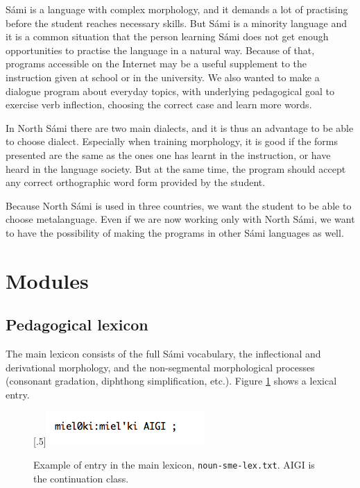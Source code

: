 \documentclass[a4paper,12pt]{article}
\begin{document}
Sámi is a language with complex morphology, and it demands a lot of practising before the student reaches necessary skills. But Sámi is a minority language and it is a common situation that the person learning Sámi does not get enough opportunities to practise the language in a natural way. Because of that, programs accessible on the Internet may be a useful supplement to the instruction given at school or in the university. We also wanted to make a dialogue program about everyday topics, with underlying pedagogical goal to exercise verb inflection, choosing the correct case and learn more words. 

In North Sámi there are two main dialects, and it is thus an advantage to be able to choose dialect. Especially when training morphology, it is good if the forms presented are the same as the ones one has learnt in the instruction, or have heard in the language society. But at the same time, the program should accept any correct orthographic word form provided by the student.

Because North Sámi is used in three countries, we want the student to be able to choose metalanguage. Even if we are now working only with North Sámi, we want to have the possibility of making the programs in other Sámi languages as well.



\section{Modules}

\subsection{Pedagogical lexicon}

The main lexicon consists of the full Sámi vocabulary, the inflectional and derivational morphology, and the non-segmental morphological processes (consonant gradation, diphthong simplification, etc.). Figure \ref{nounsmelex} shows a lexical entry.


\begin{figure}[htbp]
\begin{center}
\scalebox{.5}[.5]{\includegraphics{img/noun-sme-lex.png}}\\
\caption{Example of entry in the main lexicon, \texttt{noun-sme-lex.txt}. AIGI is the continuation class.}
\label{nounsmelex}
\end{center}
\end{figure}
\end{document}
